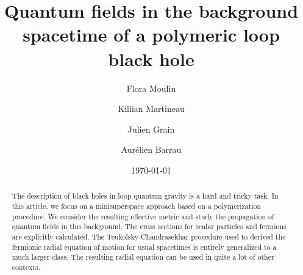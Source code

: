 \documentclass[twocolumn,amsmath,amssymb,prl,10pt,nofootinbib,superscriptaddress]{revtex4}
\begin{document}
\title{Quantum fields in the background spacetime of a polymeric loop black hole}

\author{Flora Moulin}%

\author{Killian Martineau}%

\author{Julien Grain}%
%

\author{Aur\'elien Barrau}%

\date{\today}
\begin{abstract} 
The description of black holes in loop quantum gravity is a hard and tricky task. In this article, we focus on a minisuperspace approach based on a polymerization procedure. We consider the resulting effective metric and study the propagation of quantum fields in this background. The cross sections for scalar particles and fermions are explicitly calculated. The Teukolsky-Chandrasekhar procedure used to derived the fermionic radial equation of motion for usual spacetimes is entirely generalized to a much larger class. The resulting radial equation can be used in quite a lot of other contexts.
\end{abstract}
\maketitle
\end{document}
